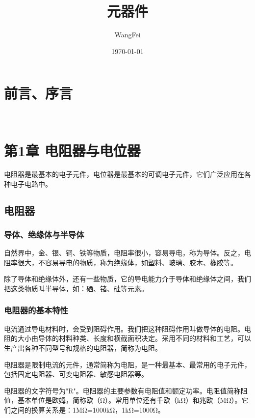 \documentclass[12pt,UTF8]{ctexbook}
\title{\heiti\zihao{0} 元器件}
\author{WangFei}
\date{\today}
\begin{document}
\maketitle
\tableofcontents

\frontmatter
\chapter{前言、序言}

\mainmatter

~\\

\chapter{第1章 电阻器与电位器}

电阻器是最基本的电子元件，电位器是最基本的可调电子元件，它们广泛应用在各种电子电路中。

\section{电阻器}

\subsection{导体、绝缘体与半导体}

自然界中，金、银、铜、铁等物质，电阻率很小，容易导电，称为导体。反之，电阻率很大，不容易导电的物质，称为绝缘体，如塑料、玻璃、胶木、橡胶等。

除了导体和绝缘体外，还有一些物质，它的导电能力介于导体和绝缘体之间，我们把这类物质叫半导体，如：硒、锗、硅等元素。

\subsection{电阻器的基本特性}

电流通过导电材料时，会受到阻碍作用。我们把这种阻碍作用叫做导体的电阻。电阻的大小由导体的材料种类、长度和横截面积决定。采用不同的材料和工艺，可以生产出各种不同型号和规格的电阻器，简称为电阻。

电阻器是限制电流的元件，通常简称为电阻，是一种最基本、最常用的电子元件，包括固定电阻器、可变电阻器、敏感电阻器等。

电阻器的文字符号为"R"。电阻器的主要参数有电阻值和额定功率。电阻值简称阻值，基本单位是欧姆，简称欧（Ω）。常用单位还有千欧（kΩ）和兆欧（MΩ）。它们之间的换算关系是：1MΩ=1000kΩ，1kΩ=1000Ω。
\end{document}
